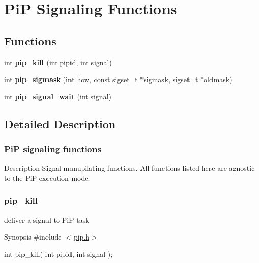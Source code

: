 \hypertarget{group__pip-signal}{\section{Pi\-P Signaling Functions}
\label{group__pip-signal}
}
\subsection*{Functions}
\begin{DoxyCompactItemize}
\item 
\hypertarget{group__pip-signal_ga4a396f38920d94b71dcfd3c898fbb82b}{int {\bfseries pip\-\_\-kill} (int pipid, int signal)}\label{group__pip-signal_ga4a396f38920d94b71dcfd3c898fbb82b}

\item 
\hypertarget{group__pip-signal_gaf546ee24368b118e937aadd2dbea2217}{int {\bfseries pip\-\_\-sigmask} (int how, const sigset\-\_\-t $\ast$sigmask, sigset\-\_\-t $\ast$oldmask)}\label{group__pip-signal_gaf546ee24368b118e937aadd2dbea2217}

\item 
\hypertarget{group__pip-signal_ga2048e7685a030e61e8c529c474899feb}{int {\bfseries pip\-\_\-signal\-\_\-wait} (int signal)}\label{group__pip-signal_ga2048e7685a030e61e8c529c474899feb}

\end{DoxyCompactItemize}


\subsection{Detailed Description}
\hypertarget{pip-signal}{}\subsubsection{Pi\-P signaling functions}\label{pip-signal}
\begin{DoxyParagraph}{Description}
Signal manupilating functions. All functions listed here are agnostic to the Pi\-P execution mode. 
\end{DoxyParagraph}
\hypertarget{pip_kill}{}\subsubsection{pip\-\_\-kill}\label{pip_kill}
deliver a signal to Pi\-P task

\begin{DoxyParagraph}{Synopsis}
\#include $<$\hyperlink{pip_8h_source}{pip.\-h}$>$ \par
int pip\-\_\-kill( int pipid, int signal );
\end{DoxyParagraph}

